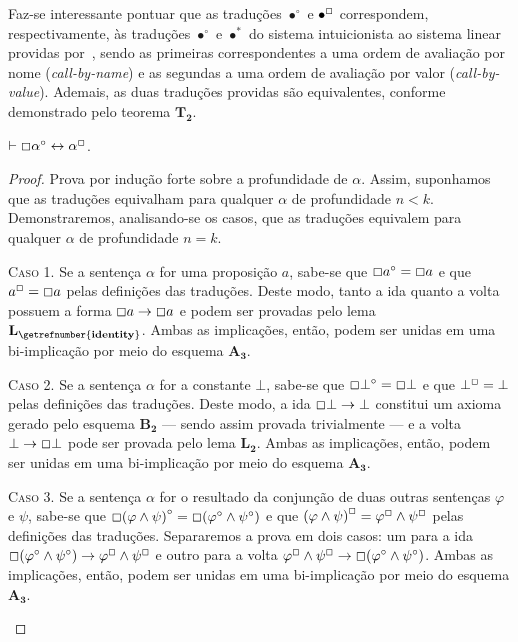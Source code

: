    Faz-se interessante pontuar que as traduções $\bullet^\circ$ e $\bullet^\Box$ correspondem, respectivamente, às traduções $\bullet^\circ$ e $\bullet^*$ do sistema intuicionista ao sistema linear providas por~\cite{Girard}, sendo as primeiras correspondentes a uma ordem de avaliação por nome (\textit{call-by-name}) e as segundas a uma ordem de avaliação por valor (\textit{call-by-value}). 
    Ademais, as duas traduções providas são equivalentes, conforme demonstrado pelo teorema $\mathbf{T_2}$.

    \begin{theorem}
        $\mathrel{\vdash}\Box\alpha^\circ\leftrightarrow\alpha^\Box$.

        \begin{proof}
            Prova por indução forte sobre a profundidade de $\alpha$.
            Assim, suponhamos que as traduções equivalham para qualquer $\alpha$ de profundidade $n<k$.
            Demonstraremos, analisando-se os casos, que as traduções equivalem para qualquer $\alpha$ de profundidade $n=k$.
    
            \begin{case}
                \textsc{Caso 1.}
                Se a sentença $\alpha$ for uma proposição $a$, sabe-se que $\Box a^\circ=\Box a$ e que $a^\Box =\Box a$ pelas definições das traduções.
                Deste modo, tanto a ida quanto a volta possuem a forma $\Box a\to\Box a$ e podem ser provadas pelo lema \hyperref[identity]{$\mathbf{L_\getrefnumber{identity}}$}.
                Ambas as implicações, então, podem ser unidas em uma bi-implicação por meio do esquema \hyperref[MA3]{$\mathbf{A_3}$}.
            \end{case}

            \begin{case}
                \textsc{Caso 2.}
                Se a sentença $\alpha$ for a constante $\bot$, sabe-se que $\Box\bot^\circ=\Box\bot$ e que $\bot^\Box=\bot$ pelas definições das traduções.
                Deste modo, a ida $\Box\bot\to\bot$ constitui um axioma gerado pelo esquema \hyperref[MB2]{$\mathbf{B_2}$} --- sendo assim provada trivialmente --- e a volta $\bot\to\Box\bot$ pode ser provada pelo lema \hyperref[explosion]{$\mathbf{L_2}$}.
                Ambas as implicações, então, podem ser unidas em uma bi-implicação por meio do esquema \hyperref[MA3]{$\mathbf{A_3}$}.
            \end{case}
    
            \begin{case}
                \textsc{Caso 3.}
                Se a sentença $\alpha$ for o resultado da conjunção de duas outras sentenças $\varphi$ e $\psi$, sabe-se que $\Box{(\varphi\wedge\psi)}^\circ=\Box(\varphi^\circ\wedge\psi^\circ)$ e que ${(\varphi\wedge\psi)}^\Box=\varphi^\Box\wedge\psi^\Box$ pelas definições das traduções.
                Separaremos a prova em dois casos: um para a ida $\Box(\varphi^\circ\wedge\psi^\circ)\to\varphi^\Box\wedge\psi^\Box$ e outro para a volta $\varphi^\Box\wedge\psi^\Box\to\Box(\varphi^\circ\wedge\psi^\circ)$. Ambas as implicações, então, podem ser unidas em uma bi-implicação por meio do esquema \hyperref[MA3]{$\mathbf{A_3}$}.
            \end{case}


\end{proof}
\end{theorem}
